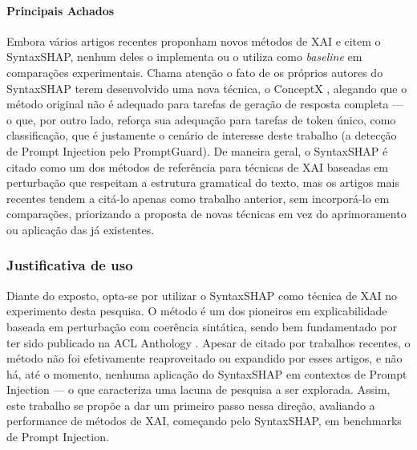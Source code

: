 \documentclass{article}
\begin{document}
\paragraph{Principais Achados} Embora vários artigos recentes proponham novos métodos de XAI e citem o SyntaxSHAP, nenhum deles o implementa ou o utiliza como \textit{baseline} em comparações experimentais. Chama atenção o fato de os próprios autores do SyntaxSHAP terem desenvolvido uma nova técnica, o ConceptX \parencite{amara2025conceptlevel}, alegando que o método original não é adequado para tarefas de geração de resposta completa — o que, por outro lado, reforça sua adequação para tarefas de token único, como classificação, que é justamente o cenário de interesse deste trabalho (a detecção de Prompt Injection pelo PromptGuard). De maneira geral, o SyntaxSHAP é citado como um dos métodos de referência para técnicas de XAI baseadas em perturbação que respeitam a estrutura gramatical do texto, mas os artigos mais recentes tendem a citá-lo apenas como trabalho anterior, sem incorporá-lo em comparações, priorizando a proposta de novas técnicas em vez do aprimoramento ou aplicação das já existentes.

\subsubsection{Justificativa de uso}

Diante do exposto, opta-se por utilizar o SyntaxSHAP como técnica de XAI no experimento desta pesquisa. O método é um dos pioneiros em explicabilidade baseada em perturbação com coerência sintática, sendo bem fundamentado por ter sido publicado na ACL Anthology \parencite{amara2024syntaxshap}. Apesar de citado por trabalhos recentes, o método não foi efetivamente reaproveitado ou expandido por esses artigos, e não há, até o momento, nenhuma aplicação do SyntaxSHAP em contextos de Prompt Injection — o que caracteriza uma lacuna de pesquisa a ser explorada. Assim, este trabalho se propõe a dar um primeiro passo nessa direção, avaliando a performance de métodos de XAI, começando pelo SyntaxSHAP, em benchmarks de Prompt Injection.

\printbibliography
\end{document}
